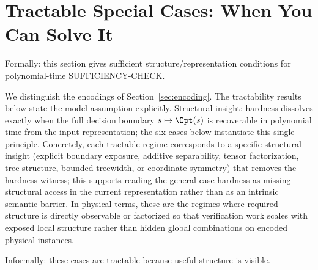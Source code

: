 \section{Tractable Special Cases: When You Can Solve It}\label{sec:tractable}

Formally: this section gives sufficient structure/representation conditions for polynomial-time SUFFICIENCY-CHECK.

We distinguish the encodings of Section~\ref{sec:encoding}. The tractability results below state the model assumption explicitly.
Structural insight: hardness dissolves exactly when the full decision boundary $s \mapsto \Opt(s)$ is recoverable in polynomial time from the input representation; the six cases below instantiate this single principle.
Concretely, each tractable regime corresponds to a specific structural insight (explicit boundary exposure, additive separability, tensor factorization, tree structure, bounded treewidth, or coordinate symmetry) that removes the hardness witness; this supports reading the general-case hardness as missing structural access in the current representation rather than as an intrinsic semantic barrier.
In physical terms, these are the regimes where required structure is directly observable or factorized so that verification work scales with exposed local structure rather than hidden global combinations on encoded physical instances.

Informally: these cases are tractable because useful structure is visible.

